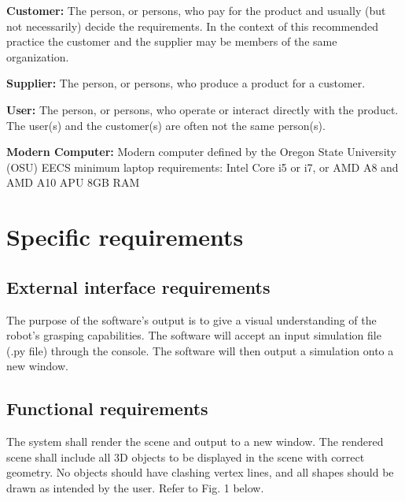 \documentclass[10pt,journal,compsoc]{IEEEtran}
\begin{document}
\begin{flushleft}
\vspace{3mm}
\textbf{Customer:}
The person, or persons, who pay for the product and usually (but not necessarily) decide the requirements. In the context of this recommended practice the customer and the supplier may be members of the same organization.

\vspace{3mm}
\textbf{Supplier:}
The person, or persons, who produce a product for a customer.

\vspace{3mm}
\textbf{User:}
The person, or persons, who operate or interact directly with the product. The user(s) and the customer(s) are often not the same person(s).

\vspace{3mm}
\textbf{Modern Computer:}
Modern computer defined by the Oregon State University (OSU) EECS minimum laptop requirements: 
Intel Core i5 or i7, or AMD A8 and AMD A10 APU 8GB RAM

\newpage

\section{Specific requirements}
\vspace{3mm}

\subsection{External interface requirements}
\vspace{3mm}
The purpose of the software's output is to give a visual understanding of the robot's grasping capabilities.
The software will accept an input simulation file (.py file) through the console.
The software will then output a simulation onto a new window.

\subsection{Functional requirements}
\vspace{3mm}
The system shall render the scene and output to a new window.
The rendered scene shall include all 3D objects to be displayed in the scene with correct geometry.
No objects should have clashing vertex lines, and all shapes should be drawn as intended by the user.
Refer to Fig. 1 below.


\end{flushleft}
\end{document}
